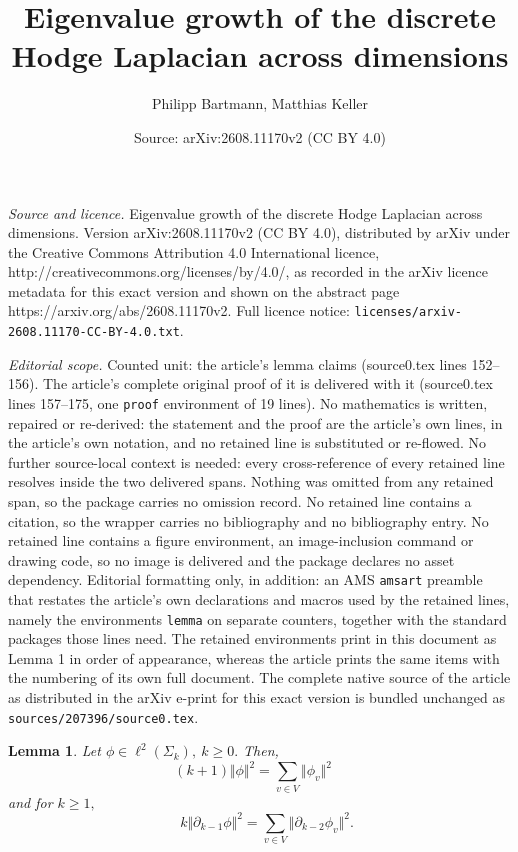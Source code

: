 \documentclass[10pt,a4paper]{amsart}
\title{Eigenvalue growth of the discrete Hodge Laplacian across dimensions}
\author{Philipp Bartmann, Matthias Keller}
\date{Source: arXiv:2608.11170v2 (CC BY 4.0)}
\newtheorem{lemma}{Lemma}
\begin{document}
\maketitle

\noindent\emph{Source and licence.} Eigenvalue growth of the discrete Hodge Laplacian across dimensions. Version arXiv:2608.11170v2 (CC BY 4.0), distributed by arXiv under the Creative Commons Attribution 4.0 International licence, http://creativecommons.org/licenses/by/4.0/, as recorded in the arXiv licence metadata for this exact version and shown on the abstract page https://arxiv.org/abs/2608.11170v2. Full licence notice: \texttt{licenses/arxiv-2608.11170-CC-BY-4.0.txt}.\par\smallskip

\noindent\textit{Editorial scope.} Counted unit: the article's lemma claims (source0.tex lines 152--156). The article's complete original proof of it is delivered with it (source0.tex lines 157--175, one \texttt{proof} environment of 19 lines). No mathematics is written, repaired or re-derived: the statement and the proof are the article's own lines, in the article's own notation, and no retained line is substituted or re-flowed.  No further source-local context is needed: every cross-reference of every retained line resolves inside the two delivered spans.  Nothing was omitted from any retained span, so the package carries no omission record.  No retained line contains a citation, so the wrapper carries no bibliography and no bibliography entry.  No retained line contains a figure environment, an image-inclusion command or drawing code, so no image is delivered and the package declares no asset dependency.  Editorial formatting only, in addition: an AMS \texttt{amsart} preamble that restates the article's own declarations and macros used by the retained lines, namely the environments \texttt{lemma} on separate counters, together with the standard packages those lines need.  The retained environments print in this document as Lemma 1 in order of appearance, whereas the article prints the same items with the numbering of its own full document.  The complete native source of the article as distributed in the arXiv e-print for this exact version is bundled unchanged as \texttt{sources/207396/source0.tex}.
\begin{lemma}\label{claims}
    Let $\phi\in\ell^2(\Sigma_k),~k\geq 0.$ Then,
    \[(k+1)\Vert\phi\Vert^2 = \sum_{v\in V}\Vert\phi_v\Vert^2\quad\] 
    and for $k\geq 1,$ \[\quad k\Vert\partial_{k-1}\phi\Vert^2 = \sum_{v\in V}\Vert\partial_{k-2}\phi_v\Vert^2.\]
\end{lemma}
\end{document}
